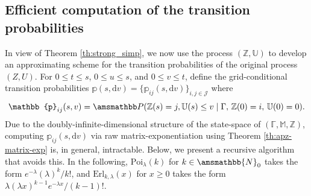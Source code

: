 \documentclass[11pt,leqno]{amsart}
\numberwithin{table}{section}
\numberwithin{figure}{section}
\numberwithin{equation}{section}
\newcommand{\dd}{\mathrm{d}}
\newcommand{\1}{{\mathds{1}}}
\newcommand{\0}{\mat{0}}
\newcommand{\N}{\amsmathbb{N}}
\renewcommand{\P }{{\amsmathbb P}}
\newcommand{\ap}[1]{\mathbb{#1}}
\begin{document}
\subsection{Efficient computation of the transition probabilities}

In view of Theorem \ref{th:strong_simp}, we now use the process $(\ap{Z},\ap{U})$ to develop an approximating scheme for the transition probabilities of the original process $(Z,U)$. For $0\le t \le s$, $0\le u \le s$, and $0\le v\le t$, define the grid-conditional transition probabilities $\ap{p}(s,\dd v)=\{\ap{p}_{ij}(s,\dd v)\}_{i,j\in \mathcal{J}}$ where
\[\ap{p}_{ij}(s,v) = \P(\ap{Z}(s)=j, \ap{U}(s)\le v \mid \Gamma, \, \ap{Z}(0)=i,\, \ap{U}(0)=0).\]
Due to the doubly-infinite-dimensional structure of the state-space of $(\ap{\Gamma},\ap{M},\ap{Z})$, computing $\ap{p}_{ij}(s,\dd v)$ via raw matrix-exponentiation using Theorem \ref{th:apz-matrix-exp} is, in general, intractable. Below, we present a recursive algorithm that avoids this. In the following, $\mathrm{Poi}_\lambda(k)$ for $k\in\N_0$ takes the form $e^{-\lambda} (\lambda)^k/k!$, and $\mathrm{Erl}_{k,\lambda}(x)$ for $x\ge 0$ takes the form $\lambda(\lambda x)^{k-1}e^{-\lambda x}/(k-1)!$.
\end{document}

